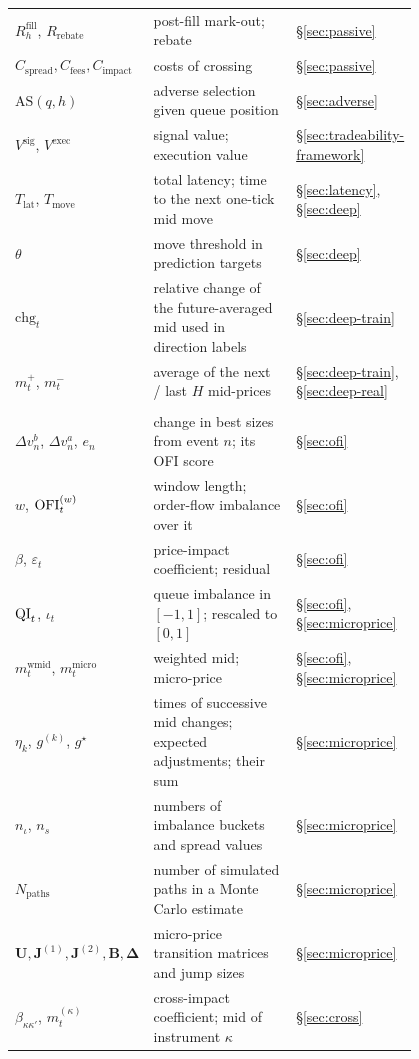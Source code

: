 \begin{center}
\begin{longtable}{>{\raggedright\arraybackslash}p{0.27\linewidth}>{\raggedright\arraybackslash}p{0.53\linewidth}l}
$R^{\text{fill}}_{h}$, $R_{\text{rebate}}$ & post-fill mark-out; rebate & \S\ref{sec:passive} \\
$C_{\text{spread}}, C_{\text{fees}}, C_{\text{impact}}$ & costs of crossing & \S\ref{sec:passive} \\
$\mathrm{AS}(q,h)$ & adverse selection given queue position & \S\ref{sec:adverse} \\
$V^{\text{sig}}$, $V^{\text{exec}}$ & signal value; execution value & \S\ref{sec:tradeability-framework} \\
$T_{\text{lat}}$, $T_{\text{move}}$ & total latency; time to the next one-tick mid move & \S\ref{sec:latency}, \S\ref{sec:deep} \\
$\theta$ & move threshold in prediction targets & \S\ref{sec:deep} \\
$\mathrm{chg}_t$ & relative change of the future-averaged mid used in direction labels & \S\ref{sec:deep-train} \\
$m^+_t$, $m^-_t$ & average of the next / last $H$ mid-prices & \S\ref{sec:deep-train}, \S\ref{sec:deep-real} \\
\midrule
\multicolumn{3}{l}{\emph{Signals}} \\
$\Delta v^b_n$, $\Delta v^a_n$, $e_n$ & change in best sizes from event $n$; its OFI score & \S\ref{sec:ofi} \\
$w$, $\mathrm{OFI}^{(w)}_t$ & window length; order-flow imbalance over it & \S\ref{sec:ofi} \\
$\beta$, $\varepsilon_t$ & price-impact coefficient; residual & \S\ref{sec:ofi} \\
$\mathrm{QI}_t$, $\iota_t$ & queue imbalance in $[-1,1]$; rescaled to $[0,1]$ & \S\ref{sec:ofi}, \S\ref{sec:microprice} \\
$m^{\text{wmid}}_t$, $m^{\text{micro}}_t$ & weighted mid; micro-price & \S\ref{sec:ofi}, \S\ref{sec:microprice} \\
$\eta_k$, $g^{(k)}$, $g^{\star}$ & times of successive mid changes; expected adjustments; their sum & \S\ref{sec:microprice} \\
$n_\iota$, $n_s$ & numbers of imbalance buckets and spread values & \S\ref{sec:microprice} \\
$N_{\text{paths}}$ & number of simulated paths in a Monte Carlo estimate & \S\ref{sec:microprice} \\
$\mathbf{U}, \mathbf{J}^{(1)}, \mathbf{J}^{(2)}, \mathbf{B}, \boldsymbol{\Delta}$ & micro-price transition matrices and jump sizes & \S\ref{sec:microprice} \\
$\beta_{\kappa\kappa'}$, $m^{(\kappa)}_t$ & cross-impact coefficient; mid of instrument $\kappa$ & \S\ref{sec:cross} \\

\end{longtable}
\end{center}
